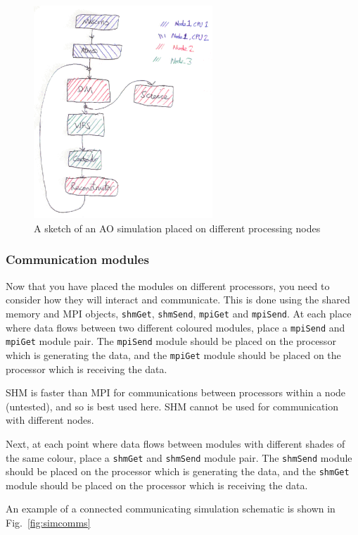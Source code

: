 \documentclass{article}
\newcommand{\mod}[1]{\texttt{#1}}
\begin{document}
\begin{figure}
\includegraphics[height=8cm]{pics/aosimsketchnodestrans.eps}
\caption{A sketch of an AO simulation placed on different processing nodes}
\label{fig:simnodes}
\end{figure}


\subsubsection{Communication modules}
Now that you have placed the modules on different processors, you need
to consider how they will interact and communicate.  This is done
using the shared memory and MPI objects, \mod{shmGet}, \mod{shmSend},
\mod{mpiGet} and \mod{mpiSend}.  At each place where data flows
between two different coloured modules, place a \mod{mpiSend} and
\mod{mpiGet} module pair.  The \mod{mpiSend} module should be placed
on the processor which is generating the data, and the \mod{mpiGet}
module should be placed on the processor which is receiving the data.

SHM is faster than MPI for communications between processors within a
node (untested), and so is best used here.  SHM cannot be used for
communication with different nodes.

Next, at each point where data flows between modules with different
shades of the same colour, place a \mod{shmGet} and \mod{shmSend}
module pair.  The \mod{shmSend} module should be placed
on the processor which is generating the data, and the \mod{shmGet}
module should be placed on the processor which is receiving the data.

An example of a connected communicating simulation schematic is shown
in Fig.~\ref{fig:simcomms}
\end{document}
